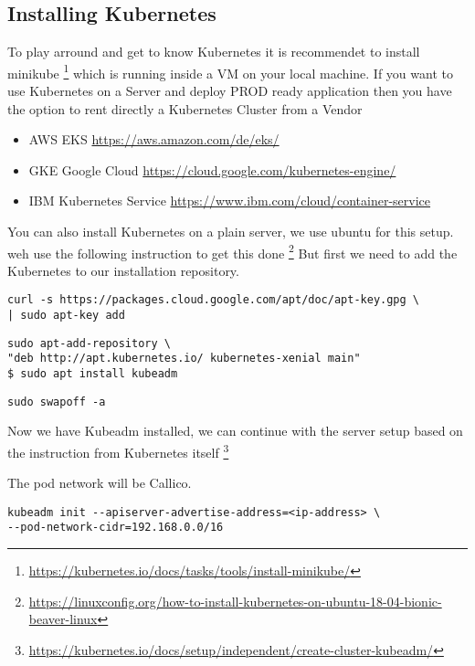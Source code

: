 \subsection{Installing Kubernetes}

To play arround and get to know Kubernetes it is recommendet to install minikube \footnote{\url{https://kubernetes.io/docs/tasks/tools/install-minikube/}} which is running inside a VM on your local machine.
If you want to use Kubernetes on a Server and deploy PROD ready application then you have the option to rent directly a Kubernetes Cluster from a Vendor
\begin{itemize}
\item AWS EKS \url{https://aws.amazon.com/de/eks/}
\item GKE Google Cloud \url{https://cloud.google.com/kubernetes-engine/}
\item IBM Kubernetes Service \url{https://www.ibm.com/cloud/container-service}
\end{itemize}

You can also install Kubernetes on a plain server, we use ubuntu for this setup. weh use the following instruction to get this done \footnote{\url{https://linuxconfig.org/how-to-install-kubernetes-on-ubuntu-18-04-bionic-beaver-linux}}
 But first we need to add the Kubernetes to our installation repository.
\begin{verbatim}
curl -s https://packages.cloud.google.com/apt/doc/apt-key.gpg \ 
| sudo apt-key add
\end{verbatim}

\begin{verbatim}
sudo apt-add-repository \
"deb http://apt.kubernetes.io/ kubernetes-xenial main"
$ sudo apt install kubeadm 
\end{verbatim}

\begin{verbatim}
sudo swapoff -a
\end{verbatim}

Now we have Kubeadm installed, we can continue with the server setup based on the instruction from Kubernetes itself \footnote{\url{https://kubernetes.io/docs/setup/independent/create-cluster-kubeadm/}}

The pod network will be Callico.

\begin{verbatim}
kubeadm init --apiserver-advertise-address=<ip-address> \
--pod-network-cidr=192.168.0.0/16
\end{verbatim}

